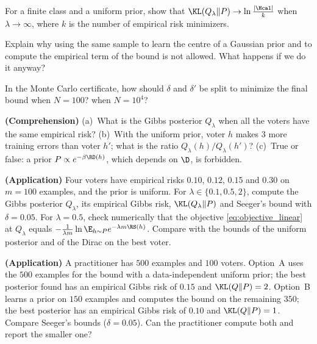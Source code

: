 \begin{exercises}
\begin{exercise}
For a finite class and a uniform prior, show that $\KL(Q_\lambda\|P)\to\ln\frac{|\Hcal|}{k}$ when
$\lambda\to\infty$, where $k$ is the number of empirical risk minimizers.
\end{exercise}
\begin{exercise}
Explain why using the same sample to learn the centre of a Gaussian prior and to
compute the empirical term of the bound is not allowed. What happens if we do it anyway?
\end{exercise}
\begin{exercise}
In the Monte Carlo certificate, how should $\delta$ and $\delta'$ be split to
minimize the final bound when $N=100$? when $N=10^4$?
\end{exercise}
\begin{exercise}
\textbf{(Comprehension)} (a)~What is the Gibbs posterior $Q_\lambda$ when all the voters
have the same empirical risk? (b)~With the uniform prior, voter $h$ makes $3$ more
training errors than voter $h'$; what is the ratio $Q_\lambda(h)/Q_\lambda(h')$? (c)~True or
false: a prior $P\propto e^{-\beta\RD(h)}$, which depends on $\D$, is forbidden.
\end{exercise}
\begin{exercise}
\textbf{(Application)} Four voters have empirical risks $0.10$, $0.12$, $0.15$ and $0.30$ on
$m=100$ examples, and the prior is uniform. For $\lambda\in\{0.1,0.5,2\}$, compute the Gibbs
posterior $Q_\lambda$, its empirical Gibbs risk, $\KL(Q_\lambda\|P)$ and Seeger's bound with
$\delta=0.05$. For $\lambda=0.5$, check numerically that the objective
\eqref{eq:objective_linear} at $Q_\lambda$ equals $-\frac1{\lambda m}\ln\E_{h\sim P}e^{-\lambda m\RS(h)}$.
Compare with the bounds of the uniform posterior and of the Dirac on the best voter.
\end{exercise}
\begin{exercise}
\textbf{(Application)} A practitioner has $500$ examples and $100$ voters. Option~A uses the
$500$ examples for the bound with a data-independent uniform prior; the best posterior found
has an empirical Gibbs risk of $0.15$ and $\KL(Q\|P)=2$. Option~B learns a prior on $150$
examples and computes the bound on the remaining $350$; the best posterior has an
empirical Gibbs risk of $0.10$ and $\KL(Q\|P)=1$. Compare Seeger's bounds ($\delta=0.05$).
Can the practitioner compute both and report the smaller one?
\end{exercise}

\end{exercises}
